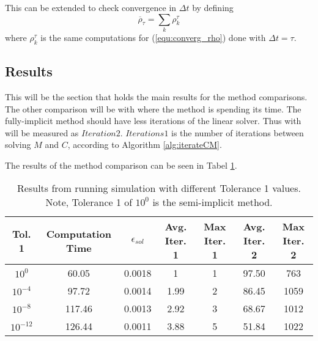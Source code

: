   This can be extended to check convergence in $\Delta t$ by defining
  \begin{equation} \label{equ:converg_rhoBar}
      \overline{\rho}_{\tau} = \sum_k \rho^{\tau}_k
  \end{equation}
  where $\rho^{\tau}_k$ is the same computations for (\ref{equ:converg_rho}) done with $\Delta t = \tau$.
  
  

\subsection{Results}
  This will be the section that holds the main results for the method comparisons.
  The other comparison will be with where the method is spending its time.
  The fully-implicit method should have less iterations of the linear solver.
  Thus with will be measured as $Iteration 2$. 
  $Iterations 1$ is the number of iterations between solving $M$ and $C$, according to Algorithm \ref{alg:iterateCM}.
  
  The results of the method comparison can be seen in Tabel \ref{tab:tolerance_comparison}.
  
  \begin{table}[h!tb]
    \centering
    \begin{tabular}{|c|c|c|c|c|c|c|}
      \hline
      Tol. 1 & Computation Time & $\epsilon_{sol}$ & Avg. Iter. 1 & Max Iter. 1 & Avg. Iter. 2 & Max Iter. 2 \\
      \hline
      $10^{0}$ & 60.05 & 0.0018 & 1 & 1 & 97.50 & 763 \\
      $10^{-4}$ & 97.72  & 0.0014 & 1.99 & 2 & 86.45 & 1059 \\
      $10^{-8}$ & 117.46 & 0.0013 & 2.92 & 3& 68.67 & 1012 \\
      $10^{-12}$& 126.44 & 0.0011& 3.88 & 5 & 51.84 & 1022 \\
      \hline
    \end{tabular}
    \caption{Results from running simulation with different Tolerance 1 values. Note, Tolerance 1 of $10^{0}$ is the semi-implicit method.}
    \label{tab:tolerance_comparison}
  \end{table}
  
  
  

